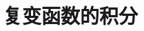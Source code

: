 \documentclass[12pt]{ctexbeamer}
\begin{document}
\setcounter{part}{2}
\part{复变函数的积分}
% 
% 
% 

% 
\end{document}
